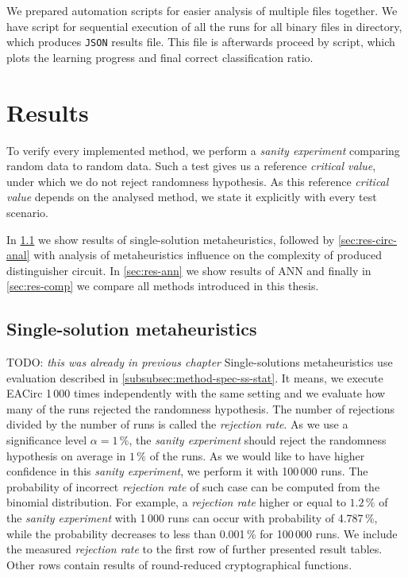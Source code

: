 \documentclass[
  print, %
  Table,   %
  nolof,     %
  nolot,     %
  11pt, %
  oneside  %
]{fithesis3}
\newcommand{\todo}[1]{TODO: \textit{#1}}
\begin{document}
We prepared automation scripts for easier analysis of multiple files together. We have script for sequential execution of all the runs for all binary files in directory, which produces \texttt{JSON} results file. This file is afterwards proceed by script, which plots the learning progress and final correct classification ratio.


\chapter{Results}
\label{chap:res}

To verify every implemented method, we perform a \textit{sanity experiment} comparing random data to random data. Such a test gives us a reference \textit{critical value}, under which we do not reject randomness hypothesis. As this reference \textit{critical value} depends on the analysed method, we state it explicitly with every test scenario.

In \cref{sec:res-ss} we show results of single-solution metaheuristics, followed by \cref{sec:res-circ-anal} with analysis of metaheuristics influence on the complexity of produced distinguisher circuit. In \cref{sec:res-ann} we show results of ANN and finally in \cref{sec:res-comp} we compare all methods introduced in this thesis.

\section{Single-solution metaheuristics}
\label{sec:res-ss}

\todo{this was already in previous chapter}
Single-solutions metaheuristics use evaluation described in \cref{subsubsec:method-spec-ss-stat}. It means, we execute EACirc 1\,000 times independently with the same setting and we evaluate how many of the runs rejected the randomness hypothesis. The number of rejections divided by the number of runs is called the \textit{rejection rate}. As we use a significance level $\alpha=1\,\%$, the \textit{sanity experiment} should reject the randomness hypothesis on average in $1\,\%$ of the runs. As we would like to have higher confidence in this \textit{sanity experiment}, we perform it with 100\,000 runs. The probability of incorrect \textit{rejection rate} of such case can be computed from the binomial distribution. For example, a \textit{rejection rate} higher or equal to $1.2\,\%$ of the \textit{sanity experiment} with 1\,000 runs can occur with probability of 4.787\,\%, while the probability decreases to less than 0.001\,\% for 100\,000 runs. We include the measured \textit{rejection rate} to the first row of further presented result tables. Other rows contain results of round-reduced cryptographical functions.
\end{document}
